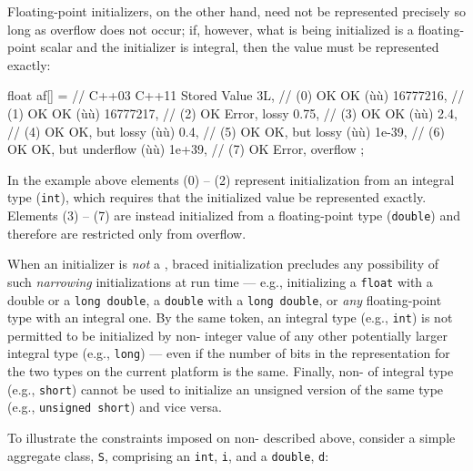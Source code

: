 Floating-point initializers, on the other hand, need not be represented
precisely so long as overflow does not occur; if, however, what is being
initialized is a floating-point scalar and the initializer is integral,
then the value must be represented exactly:

\begin{emcppslisting}
float af[] =     //       C++03   C++11                  Stored Value
{
     3L,        // (0)     OK     OK                   (ù{}ù)
     16777216,  // (1)     OK     OK                   (ù{}ù)
     16777217,  // (2)     OK     Error, lossy
     0.75,      // (3)     OK     OK                   (ù{}ù)
     2.4,       // (4)     OK     OK, but lossy        (ù{}ù)
     0.4,       // (5)     OK     OK, but lossy        (ù{}ù)
     1e-39,     // (6)     OK     OK, but underflow    (ù{}ù)
     1e+39,     // (7)     OK     Error, overflow
};
\end{emcppslisting}


\noindent In the example above elements (0) -- (2) represent initialization from
an integral type (\lstinline!int!), which requires that the initialized
value be represented exactly. Elements (3) -- (7) are instead
initialized from a floating-point type (\lstinline!double!) and therefore
are restricted only from overflow.

When an initializer is \emph{not} a , braced
initialization precludes any possibility of such \emph{narrowing}
initializations at run time --- e.g., initializing a \lstinline!float! with
a double or a \lstinline!long!~\lstinline!double!, a \lstinline!double! with a
\lstinline!long!~\lstinline!double!, or \emph{any} floating-point type with an
integral one. By the same token, an integral type (e.g., \lstinline!int!)
is not permitted to be initialized by non-
integer value of any other potentially larger integral type (e.g.,
\lstinline!long!) --- even if the number of bits in the representation for
the two types on the current platform is the same. Finally,
non- of integral type (e.g., \lstinline!short!)
cannot be used to initialize an unsigned version of the same type (e.g.,
\lstinline!unsigned!~\lstinline!short!) and vice versa.

To illustrate the constraints imposed on
non- described above, consider a simple
aggregate class, \lstinline!S!, comprising an \lstinline!int!, \lstinline!i!, and
a \lstinline!double!, \lstinline!d!:

